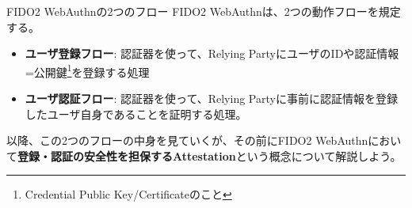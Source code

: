\documentclass[12pt,dvipdfmx,uplatex]{beamer}
\begin{document}
\begin{frame}{FIDO2 WebAuthnの2つのフロー}
FIDO2 WebAuthnは、2つの動作フローを規定する。
\begin{itemize}
 \item \alert{\textbf{ユーザ登録フロー}}: 認証器を使って、Relying PartyにユーザのIDや認証情報=公開鍵\footnote[frame]{\scriptsize Credential Public Key/Certificateのこと}を登録する処理
 \item \alert{\textbf{ユーザ認証フロー}}: 認証器を使って、Relying Partyに事前に認証情報を登録したユーザ自身であることを証明する処理。
\end{itemize}

\vspace{2ex}

以降、この2つのフローの中身を見ていくが、その前にFIDO2 WebAuthnにおいて\textbf{登録・認証の安全性を担保するAttestation}という概念について解説しよう。
\end{frame}
\end{document}

